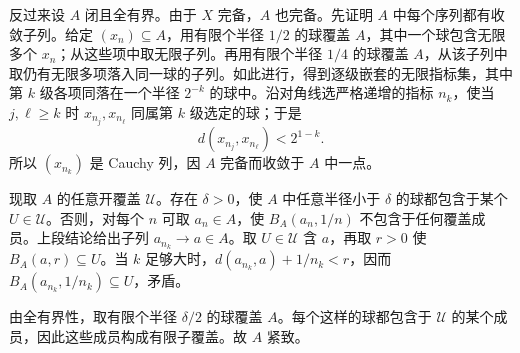 \documentclass{article}
\begin{document}
反过来设 $A$ 闭且全有界。由于 $X$ 完备，$A$ 也完备。先证明 $A$ 中每个序列都有收敛子列。给定 $(x_n)\subseteq A$，用有限个半径 $1/2$ 的球覆盖 $A$，其中一个球包含无限多个 $x_n$；从这些项中取无限子列。再用有限个半径 $1/4$ 的球覆盖 $A$，从该子列中取仍有无限多项落入同一球的子列。如此进行，得到逐级嵌套的无限指标集，其中第 $k$ 级各项同落在一个半径 $2^{-k}$ 的球中。沿对角线选严格递增的指标 $n_k$，使当 $j,\ell\ge k$ 时 $x_{n_j},x_{n_\ell}$ 同属第 $k$ 级选定的球；于是
\[
d(x_{n_j},x_{n_\ell})<2^{1-k}.
\]
所以 $(x_{n_k})$ 是 Cauchy 列，因 $A$ 完备而收敛于 $A$ 中一点。

现取 $A$ 的任意开覆盖 $\mathcal U$。存在 $\delta>0$，使 $A$ 中任意半径小于 $\delta$ 的球都包含于某个 $U\in\mathcal U$。否则，对每个 $n$ 可取 $a_n\in A$，使 $B_A(a_n,1/n)$ 不包含于任何覆盖成员。上段结论给出子列 $a_{n_k}\to a\in A$。取 $U\in\mathcal U$ 含 $a$，再取 $r>0$ 使 $B_A(a,r)\subseteq U$。当 $k$ 足够大时，$d(a_{n_k},a)+1/n_k<r$，因而 $B_A(a_{n_k},1/n_k)\subseteq U$，矛盾。

由全有界性，取有限个半径 $\delta/2$ 的球覆盖 $A$。每个这样的球都包含于 $\mathcal U$ 的某个成员，因此这些成员构成有限子覆盖。故 $A$ 紧致。
\end{document}
